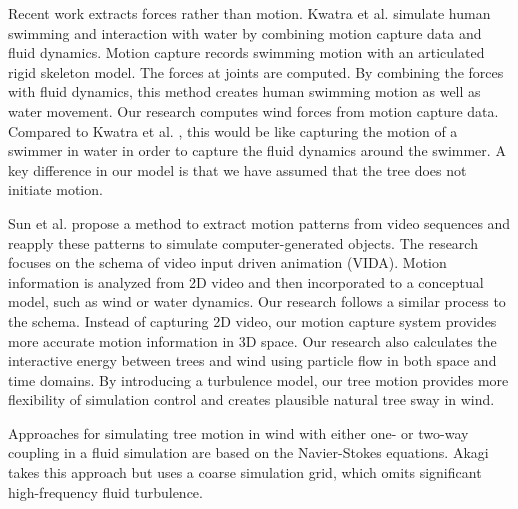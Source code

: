 Recent work extracts forces rather than motion. Kwatra et al. \cite{Kwatra:TVCG200966} simulate human swimming and interaction with water by combining motion capture data and fluid dynamics. Motion capture records swimming motion with an articulated rigid skeleton model. The forces at joints are computed. By combining the forces with fluid dynamics, this method creates human swimming motion as well as water movement. Our research computes wind forces from motion capture data. Compared to Kwatra et al. \cite{Kwatra:TVCG200966}, this would be like capturing the motion of a swimmer in water in order to capture the fluid dynamics around the swimmer. A key difference in our model is that we have assumed that the tree does not initiate motion.

Sun et al. \cite{Sun:2003:VID} propose a method to extract motion patterns from video sequences and reapply these patterns to simulate computer-generated objects. The research focuses on the schema of video input driven animation (VIDA). Motion information is analyzed from 2D video and then incorporated to a conceptual model, such as wind or water dynamics. Our research follows a similar process to the schema. Instead of capturing 2D video, our motion capture system provides more accurate motion information in 3D space. Our research also calculates the interactive energy between trees and wind using particle flow in both space and time domains. By introducing a turbulence model, our tree motion provides more flexibility of simulation control and creates plausible natural tree sway in wind.  

Approaches for simulating tree motion in wind with either one- or two-way coupling in a fluid simulation are based on the Navier-Stokes equations. Akagi \cite{Akagi:cg06} takes this approach but uses a coarse simulation grid, which omits significant high-frequency fluid turbulence. 


